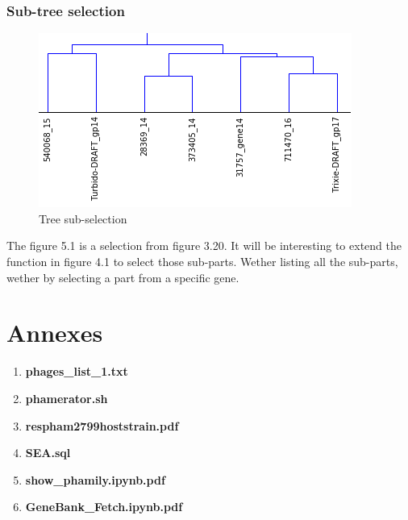 \documentclass[a4paper,11pt]{report}
\begin{document}
\subsection{Sub-tree selection}
\begin{figure}[H] 
	\begin{center}
		\includegraphics[scale=0.7]{img/tree_fig_4}
		\caption{Tree sub-selection}
	\end{center}
\end{figure}

The figure 5.1 is a selection from figure 3.20. It will be interesting to extend the function in figure 4.1 to select those sub-parts. Wether listing all the sub-parts, wether by selecting a part from a specific gene.

\addtocounter{chapter}{1}
\listoffigures

\addtocounter{chapter}{1}


\chapter{Annexes}
\begin{enumerate}
	\item \textbf{phages\_list\_1.txt}
	\item \textbf{phamerator.sh}
	\item \textbf{respham2799hoststrain.pdf}
	\item \textbf{SEA.sql}
	\item \textbf{show\_phamily.ipynb.pdf}
	\item \textbf{GeneBank\_Fetch.ipynb.pdf}
\end{enumerate}
\end{document}
